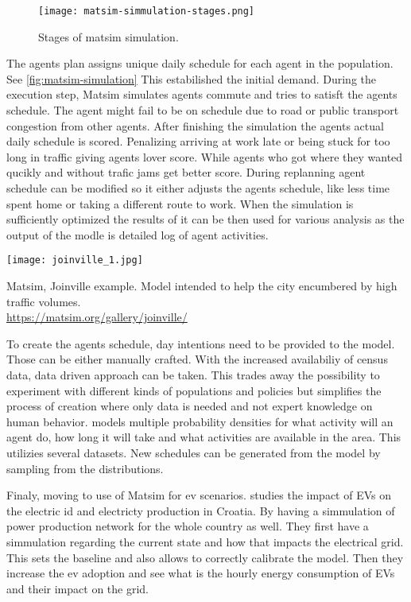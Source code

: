 \begin{figure}
    \texttt{[image: matsim-simmulation-stages.png]}
    \caption[Matsim, Simulation stages]{Stages of matsim simulation. \cite{Horni2016}}
\end{figure}

The agents plan assigns unique daily schedule for each agent in the population. See \ref{fig:matsim-simulation} This estabilished the initial demand. During the execution step, Matsim simulates agents commute and tries to satisft the agents schedule. The agent might fail to be on schedule due to road or public transport congestion from other agents. After finishing the simulation the agents actual daily schedule is scored. Penalizing arriving at work late or being stuck for too long in traffic giving agents lover score. While agents who got where they wanted qucikly and without trafic jams get better score. During replanning agent schedule can be modified so it either adjusts the agents schedule, like less time spent home or taking a different route to work. When the simulation is sufficiently optimized the results of it can be then used for various analysis as the output of the modle is detailed log of agent activities.

\begin{marginfigure}
    \texttt{[image: joinville\_1.jpg]}
    \caption[Matsim, Joinville example]{Matsim, Joinville example. Model intended to help the city encumbered by high traffic volumes.\\
        \url{https://matsim.org/gallery/joinville/}}
\end{marginfigure}

To create the agents schedule, day intentions need to be provided to the model. Those can be either manually crafted. With the increased availabiliy of census data, data driven approach can be taken. This trades away the possibility to experiment with different kinds of populations and policies but simplifies the process of creation where only data is needed and not expert knowledge on human behavior.  models multiple probability densities for what activity will an agent do, how long it will take and what activities are available in the area. This utilizies several datasets. New schedules can be generated from the model by sampling from the distributions.

Finaly, moving to use of Matsim for ev scenarios.  studies the impact of EVs on the electric id and electricty production in Croatia. By having a simmulation of power production network for the whole country as well. They first have a simmulation regarding the current state and how that impacts the electrical grid. This sets the baseline and also allows to correctly calibrate the model. Then they increase the ev adoption and see what is the hourly energy consumption of EVs and their impact on the grid.


